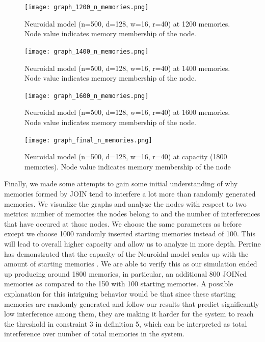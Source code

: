     \begin{figure}%
        \centering
        \texttt{[image: graph\_1200\_n\_memories.png]}
        \caption[Memory membership per node of Neuroidal model at 1200 memories]{Neuroidal model (n=500, d=128, w=16, r=40) at 1200 memories. Node value indicates memory membership of the node.}
        \label{fig:subn1}
    \end{figure}

    \begin{figure}%
        \centering
        \texttt{[image: graph\_1400\_n\_memories.png]}
        \caption[Memory membership per node of Neuroidal model at 1400 memories]{Neuroidal model (n=500, d=128, w=16, r=40) at 1400 memories. Node value indicates memory membership of the node.}
        \label{fig:subn2}
    \end{figure}

    \begin{figure}%
        \centering
        \texttt{[image: graph\_1600\_n\_memories.png]}
        \caption[Memory membership per node of Neuroidal model at 1600 memories]{Neuroidal model (n=500, d=128, w=16, r=40) at 1600 memories. Node value indicates memory membership of the node.}
        \label{fig:subn3}
    \end{figure}
    
    \begin{figure}%
        \centering
        \texttt{[image: graph\_final\_n\_memories.png]}
        \caption[Memory membership per node of Neuroidal model at capacity]{Neuroidal model (n=500, d=128, w=16, r=40) at capacity (1800 memories). Node value indicates memory membership of the node}
        \label{fig:subn4}
    \end{figure}


    


Finally, we made some attempts to gain some initial understanding of why memories formed by JOIN tend to interfere a lot more than randomly generated memories. We visualize the graphs and analyze the nodes with respect to two metrics: number of memories the nodes belong to and the number of interferences that have occured at those nodes. We choose the same parameters as before except we choose 1000 randomly inserted starting memories instead of 100. This will lead to overall higher capacity and allow us to analyze in more depth. Perrine has demonstrated that the capacity of the Neuroidal model scales up with the amount of starting memories \cite{perrine2023neural}. We are able to verify this as our simulation ended up producing around 1800 memories, in particular, an additional 800 JOINed memories as compared to the 150 with 100 starting memories. A possible explanation for this intriguing behavior would be that since these starting memories are randomly generated and follow our results that predict significantly low interference among them, they are making it harder for the system to reach the threshold in constraint 3 in definition 5, which can be interpreted as total interference over number of total memories in the system. 

